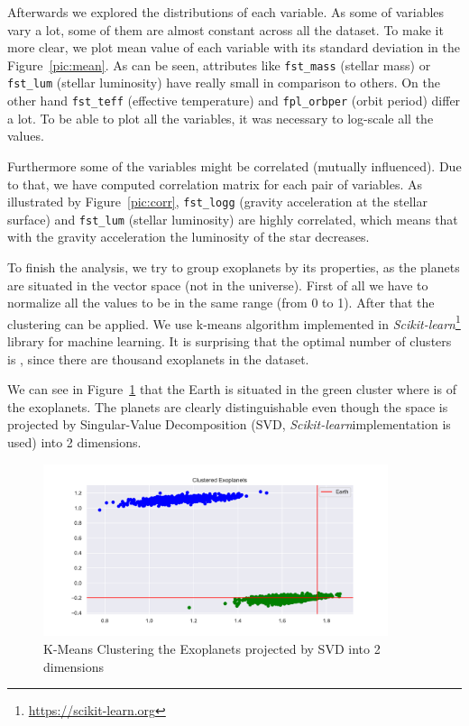 \documentclass[12p]{article}
\begin{document}
Afterwards we explored the distributions of each variable. As some of variables vary a lot, some of them are almost constant across all the dataset. To make it more clear, we plot mean value of each variable with its standard deviation in the Figure~\ref{pic:mean}. As can be seen, attributes like \verb|fst_mass| (stellar mass) or \verb|fst_lum| (stellar luminosity) have really small in comparison to others. On the other hand \verb|fst_teff| (effective temperature) and \verb|fpl_orbper| (orbit period) differ a lot. To be able to plot all the variables, it was necessary to log-scale all the values. 

Furthermore some of the variables might be correlated (mutually influenced). Due to that, we have computed correlation matrix for each pair of variables. As illustrated by Figure~\ref{pic:corr}, \verb|fst_logg| (gravity acceleration at the stellar surface) and \verb|fst_lum| (stellar luminosity) are highly correlated, which means that with the gravity acceleration the luminosity of the star decreases.

To finish the analysis, we try to group exoplanets by its properties, as the planets are situated in the vector space (not in the universe). First of all we have to normalize all the values to be in the same range (from 0 to 1). After that the clustering can be applied. We use k-means algorithm implemented in \textit{Scikit-learn}\footnote{\url{https://scikit-learn.org}} library for machine learning. It is surprising that the optimal number of clusters is , since there are  thousand exoplanets in the dataset.

We can see in Figure~\ref{pic:cluster} that the Earth is situated in the green cluster where is  of the exoplanets. The planets are clearly distinguishable even though the space is projected by Singular-Value Decomposition (SVD, \textit{Scikit-learn}\footnotemark[\value{footnote}] implementation is used) into 2 dimensions.

\begin{figure}\centering
    \includegraphics[width=0.9\textwidth]{graphics/cluster.pdf}
    \caption{K-Means Clustering the Exoplanets projected by SVD into 2 dimensions}
    \label{pic:cluster}
\end{figure}
\end{document}
